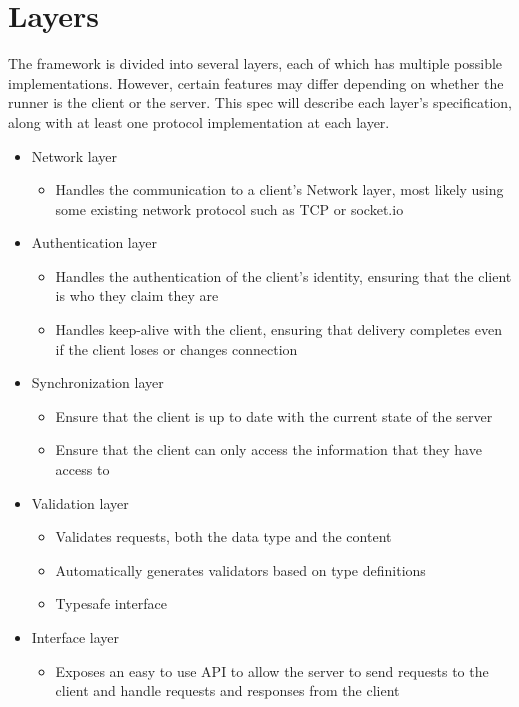 \documentclass{article}
\begin{document}
\section{Layers}
The framework is divided into several layers, each of which has multiple possible implementations. However, certain features may differ depending on whether the runner is the client or the server. This spec will describe each layer's specification, along with at least one protocol implementation at each layer.

\begin{itemize}
    \item Network layer
    \begin{itemize}
        \item Handles the communication to a client's Network layer, most likely using some existing network protocol such as TCP or socket.io
    \end{itemize}
    \item Authentication layer
    \begin{itemize}
        \item Handles the authentication of the client's identity, ensuring that the client is who they claim they are
        \item Handles keep-alive with the client, ensuring that delivery completes even if the client loses or changes connection
    \end{itemize}
    \item Synchronization layer
    \begin{itemize}
        \item Ensure that the client is up to date with the current state of the server
        \item Ensure that the client can only access the information that they have access to
    \end{itemize}
    \item Validation layer
    \begin{itemize}
        \item Validates requests, both the data type and the content
        \item Automatically generates validators based on type definitions
        \item Typesafe interface
    \end{itemize}
    \item Interface layer
    \begin{itemize}
        \item Exposes an easy to use API to allow the server to send requests to the client and handle requests and responses from the client
    \end{itemize}
\end{itemize}
\end{document}
